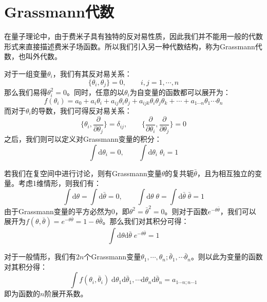 \chapter{Grassmann代数}
在量子理论中，由于费米子具有独特的反对易性质，因此我们并不能用一般的代数形式来直接描述费米子场函数。所以我们引入另一种代数结构，称为Grassmann代数，也叫外代数。

对于一组变量$\theta_i$，我们有其反对易关系：
\begin{equation}
\{\theta_i,\theta_j\}=0,\qquad i,j=1,\cdots,n
\end{equation}
那么我们易得\(\theta_i^2=0\)。同时，任意的以$\theta_i$为自变量的函数都可以展开为：
\begin{equation}
f(\theta_i)=a_0+a_i\theta_i+a_{ij}\theta_i \theta_j+a_{ijk}\theta_i\theta_j\theta_k+\cdots+a_{1\cdots n}\theta_1\cdots \theta_n
\end{equation}
而对于$\theta_i$的导数，我们可得反对易关系：
\begin{equation}
\Big\{\theta_i,\frac{\partial}{\partial \theta_j}\Big\}=\delta_{ij},\qquad\Big\{\frac{\partial}{\partial \theta_i},\frac{\partial}{\partial \theta_j}\Big\}=0
\end{equation}
之后，我们则可以定义对Grassmann变量的积分：
\begin{equation}
\int\mathrm{d}\theta_i=0,\qquad\int\mathrm{d}\theta_i\;\theta_i=1
\end{equation}

若我们在复空间中进行讨论，则有Grassmann变量$\theta$的复共轭$\bar{\theta}$，且为相互独立的变量。考虑1维情形，则我们有：
\begin{equation}
\int\mathrm{d}\theta=\int\mathrm{d}\bar{\theta}=0,\qquad\int\mathrm{d}\theta\;\theta=\int\mathrm{d}\bar{\theta}\;\bar{\theta}=1
\end{equation}
由于Grassmann变量的平方必然为0，即$\theta^2=\bar{\theta}^2=0$。则对于函数$e^{-\theta\bar{\theta}}$，我们可以展开为\(f(\theta,\bar{\theta})=e^{-\theta\bar{\theta}}=1-\theta\bar{\theta}\)。那么我们对其积分可得：
\begin{equation}
\int\mathrm{d}\theta\mathrm{d}\bar{\theta}\;e^{-\theta\bar{\theta}}=1
\end{equation}

对于一般情形，我们有$2n$个Grassmann变量$\theta_1,\cdots,\theta_n; \bar{\theta}_1,\cdots\bar{\theta}_n$。则以此为变量的函数对其积分得：
\begin{equation}
\int f(\theta_i,\bar{\theta}_i)\;\mathrm{d}\theta_1\mathrm{d}\bar{\theta}_1,\cdots\mathrm{d}\theta_n\mathrm{d}\bar{\theta}_n=a_{1\cdots n;n\cdots 1}
\end{equation}
即为函数的$n$阶展开系数。
\newpage


